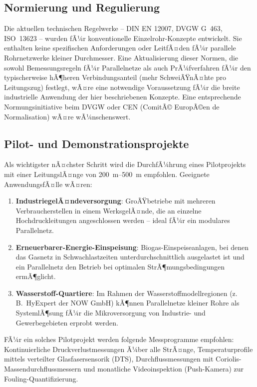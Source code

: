 ﻿\documentclass[12pt,a4paper,twoside]{article}
\theoremstyle{plain}
\theoremstyle{definition}
\theoremstyle{remark}
\begin{document}
\subsection{Normierung und Regulierung}
\label{ssec:ausblick_normen}

Die aktuellen technischen Regelwerke -- DIN EN 12007, DVGW G~463,
ISO~13623 -- wurden fÃ¼r konventionelle Einzelrohr-Konzepte entwickelt.
Sie enthalten keine spezifischen Anforderungen oder LeitfÃ¤den fÃ¼r
parallele Rohrnetzwerke kleiner Durchmesser.
Eine Aktualisierung dieser Normen, die sowohl Bemessungsregeln fÃ¼r Parallelnetze
als auch PrÃ¼fverfahren fÃ¼r den typischerweise hÃ¶heren Verbindungsanteil
(mehr SchweiÃŸnÃ¤hte pro Leitungszug) festlegt, wÃ¤re eine notwendige Voraussetzung
fÃ¼r die breite industrielle Anwendung der hier beschriebenen Konzepte.
Eine entsprechende Normungsinitiative beim DVGW oder CEN (ComitÃ© EuropÃ©en
de Normalisation) wÃ¤re wÃ¼nschenswert.

\subsection{Pilot- und Demonstrationsprojekte}
\label{ssec:ausblick_pilot}

Als wichtigster nÃ¤chster Schritt wird die DurchfÃ¼hrung eines
Pilot\-pro\-jekts mit einer LeitungslÃ¤nge von \SIrange{200}{500}{\metre}
empfohlen.
Geeignete AnwendungsfÃ¤lle wÃ¤ren:
\begin{enumerate}
  \item \textbf{IndustriegelÃ¤ndeversorgung}: GroÃŸbetriebe mit mehreren
        Verbraucherstellen in einem WerksgelÃ¤nde, die an einzelne
        Hochdruckleitungen angeschlossen werden -- ideal fÃ¼r ein modulares
        Parallelnetz.
  \item \textbf{Erneuerbarer-Energie-Einspeisung}: Biogas-Einspeiseanlagen,
        bei denen das Gasnetz in Schwachlastzeiten unterdurchschnittlich
        ausgelastet ist und ein Parallelnetz den Betrieb bei optimalen
        StrÃ¶mungsbedingungen ermÃ¶glicht.
  \item \textbf{Wasserstoff-Quartiere}: Im Rahmen der Wasserstoffmodellregionen
        (z.\,B.\ HyExpert der NOW GmbH) kÃ¶nnen Parallelnetze kleiner Rohre
        als SystemlÃ¶sung fÃ¼r die Mikroversorgung von Industrie- und
        Gewerbegebieten erprobt werden.
\end{enumerate}

FÃ¼r ein solches Pilotprojekt werden folgende Messprogramme empfohlen:
Kontinuierliche Druckverlustmessungen Ã¼ber alle StrÃ¤nge, Temperaturprofile
mittels verteilter Glasfasersensorik (DTS), Durchflussmessungen mit
Coriolis-Massendurchflussmessern und monatliche Videoinspektion (Push-Kamera)
zur Fouling-Quantifizierung.
\end{document}
